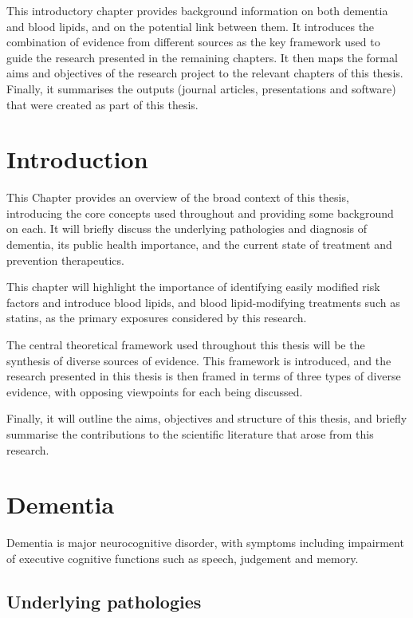 \documentclass[a4paper, twoside]{templates/ociamthesis}
\begin{document}
This introductory chapter provides background information on both dementia and blood lipids, and on the potential link between them. It introduces the combination of evidence from different sources as the key framework used to guide the research presented in the remaining chapters. It then maps the formal aims and objectives of the research project to the relevant chapters of this thesis. Finally, it summarises the outputs (journal articles, presentations and software) that were created as part of this thesis.

\hypertarget{introduction}{%
\section{Introduction}\label{introduction}}

This Chapter provides an overview of the broad context of this thesis, introducing the core concepts used throughout and providing some background on each. It will briefly discuss the underlying pathologies and diagnosis of dementia, its public health importance, and the current state of treatment and prevention therapeutics.

This chapter will highlight the importance of identifying easily modified risk factors and introduce blood lipids, and blood lipid-modifying treatments such as statins, as the primary exposures considered by this research.

The central theoretical framework used throughout this thesis will be the synthesis of diverse sources of evidence. This framework is introduced, and the research presented in this thesis is then framed in terms of three types of diverse evidence, with opposing viewpoints for each being discussed.

Finally, it will outline the aims, objectives and structure of this thesis, and briefly summarise the contributions to the scientific literature that arose from this research.

\hypertarget{dementia}{%
\section{Dementia}\label{dementia}}

Dementia is major neurocognitive disorder, with symptoms including impairment of executive cognitive functions such as speech, judgement and memory.

\hypertarget{underlying-pathologies}{%
\subsection{Underlying pathologies}\label{underlying-pathologies}}
\end{document}
